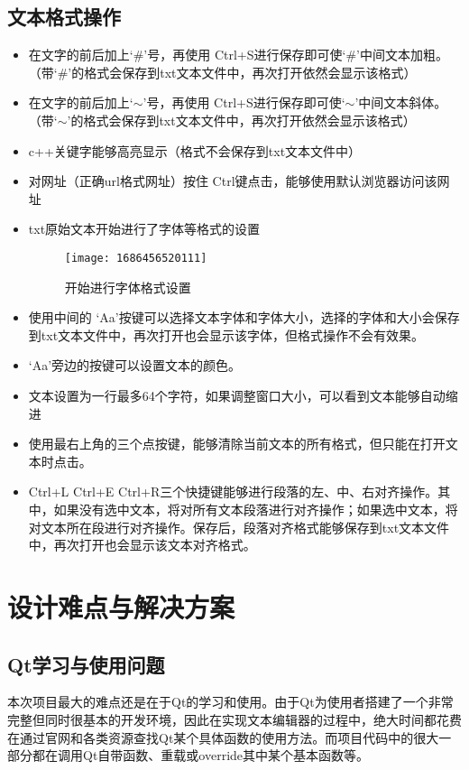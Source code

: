 \documentclass{./source/Report}
\begin{document}
\subsection{文本格式操作}
\begin{itemize}
    \item 在文字的前后加上‘\#’号，再使用 Ctrl+S进行保存即可使‘\#’中间文本加粗。（带‘\#’的格式会保存到txt文本文件中，再次打开依然会显示该格式）
    \item 在文字的前后加上‘$\sim$’号，再使用 Ctrl+S进行保存即可使‘$\sim$’中间文本斜体。（带‘$\sim$’的格式会保存到txt文本文件中，再次打开依然会显示该格式）
    \item c++关键字能够高亮显示（格式不会保存到txt文本文件中）
    \item 对网址（正确url格式网址）按住 Ctrl键点击，能够使用默认浏览器访问该网址
    \item txt原始文本开始进行了字体等格式的设置
    \begin{figure}[!htbp]
        \centering
        \begin{minipage}{0.45\textwidth}
            \centering
            \texttt{[image: 1686456520111]}
            \caption{开始进行字体格式设置}
        \end{minipage}
    \end{figure}
    \item 使用中间的 ‘Aa’按键可以选择文本字体和字体大小，选择的字体和大小会保存到txt文本文件中，再次打开也会显示该字体，但格式操作不会有效果。
    \item ‘Aa’旁边的按键可以设置文本的颜色。
    \item 文本设置为一行最多64个字符，如果调整窗口大小，可以看到文本能够自动缩进
    \item 使用最右上角的三个点按键，能够清除当前文本的所有格式，但只能在打开文本时点击。
    \item Ctrl+L Ctrl+E Ctrl+R三个快捷键能够进行段落的左、中、右对齐操作。其中，如果没有选中文本，将对所有文本段落进行对齐操作；如果选中文本，将对文本所在段进行对齐操作。保存后，段落对齐格式能够保存到txt文本文件中，再次打开也会显示该文本对齐格式。
\end{itemize}




\section{设计难点与解决方案}
\subsection{Qt学习与使用问题}
本次项目最大的难点还是在于Qt的学习和使用。由于Qt为使用者搭建了一个非常完整但同时很基本的开发环境，因此在实现文本编辑器的过程中，绝大时间都花费在通过官网和各类资源查找Qt某个具体函数的使用方法。而项目代码中的很大一部分都在调用Qt自带函数、重载或override其中某个基本函数等。
\end{document}
